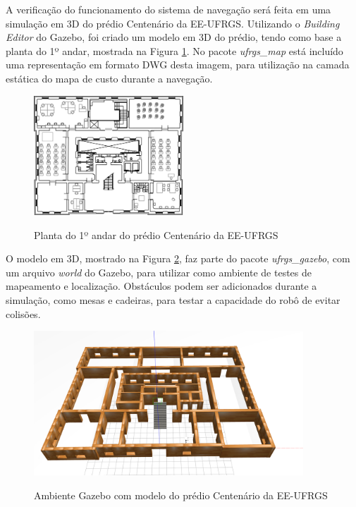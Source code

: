 \documentclass[repeatfields,xlists,xpacks,oneside,yearsonly]{ufrgscca}
\begin{document}
A verificação do funcionamento do sistema de navegação será feita em uma simulação
em 3D do prédio Centenário da EE-UFRGS.
Utilizando o \textit{Building Editor} do Gazebo, foi criado um modelo em 3D do prédio,
tendo como base a planta do 1º andar, mostrada na Figura \ref{fig:planta_centenario}.
No pacote \textit{ufrgs\_map} está incluído uma representação em formato DWG desta
imagem, para utilização na camada estática do mapa de custo durante a navegação.

\begin{figure}[htbp]
    {
        \centering
        \caption{Planta do 1º andar do prédio Centenário da EE-UFRGS}
        \label{fig:planta_centenario}
        \includegraphics[width=0.5\textwidth]{centenario_floor_plan.png}\\
    }
    {}
\end{figure}

O modelo em 3D, mostrado na Figura \ref{fig:gazebo_centenario}, faz parte do pacote
\textit{ufrgs\_gazebo}, com um arquivo \textit{world} do Gazebo,
para utilizar como ambiente de testes de mapeamento e localização.
Obstáculos podem ser adicionados durante a simulação, como mesas e cadeiras,
para testar a capacidade do robô de evitar colisões.

\begin{figure}[htbp]
    {
        \centering
        \caption{Ambiente Gazebo com modelo do prédio Centenário da EE-UFRGS}
        \label{fig:gazebo_centenario}
        \includegraphics[width=0.9\textwidth]{gazebo.png}\\
    }
    {}
\end{figure}
\end{document}
